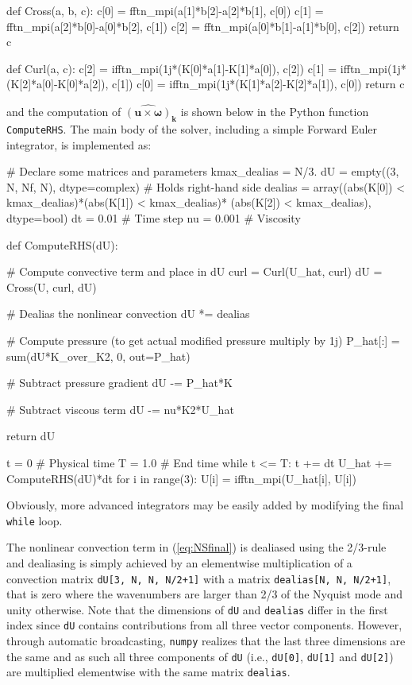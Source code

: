 \documentclass[11pt, oneside]{article}
\newcommand{\inpyth}{\lstinline[style=pythonstyle, basicstyle=\ttfamily]} %[]%
\begin{document}
\begin{python}
def Cross(a, b, c):
    c[0] = fftn_mpi(a[1]*b[2]-a[2]*b[1], c[0])
    c[1] = fftn_mpi(a[2]*b[0]-a[0]*b[2], c[1])
    c[2] = fftn_mpi(a[0]*b[1]-a[1]*b[0], c[2])
    return c

def Curl(a, c):
    c[2] = ifftn_mpi(1j*(K[0]*a[1]-K[1]*a[0]), c[2])
    c[1] = ifftn_mpi(1j*(K[2]*a[0]-K[0]*a[2]), c[1])
    c[0] = ifftn_mpi(1j*(K[1]*a[2]-K[2]*a[1]), c[0])
    return c

\end{python}
and the computation of $\widehat{( \bm{u} \times \bm{\omega})}_{\bm{k}}$ is shown below in the Python function \inpyth{ComputeRHS}. The main body of the solver, including a simple Forward Euler integrator, is implemented as:
\begin{python}
# Declare some matrices and parameters
kmax_dealias = N/3.
dU = empty((3, N, Nf, N), dtype=complex)  # Holds right-hand side
dealias = array((abs(K[0]) < kmax_dealias)*(abs(K[1]) < kmax_dealias)*
                (abs(K[2]) < kmax_dealias), dtype=bool)
dt = 0.01    # Time step
nu = 0.001   # Viscosity

def ComputeRHS(dU):

    # Compute convective term and place in dU
    curl = Curl(U_hat, curl)
    dU = Cross(U, curl, dU)

    # Dealias the nonlinear convection
    dU *= dealias

    # Compute pressure (to get actual modified pressure multiply by 1j)
    P_hat[:] = sum(dU*K_over_K2, 0, out=P_hat)

    # Subtract pressure gradient
    dU -= P_hat*K

    # Subtract viscous term
    dU -= nu*K2*U_hat

    return dU

t = 0        # Physical time
T = 1.0      # End time
while t <= T:
    t += dt
    U_hat += ComputeRHS(dU)*dt
    for i in range(3):
        U[i] = ifftn_mpi(U_hat[i], U[i])

\end{python}
Obviously, more advanced integrators may be easily added by modifying the final \inpyth{while} loop. 

The nonlinear convection term in (\ref{eq:NSfinal}) is dealiased using the 2/3-rule and dealiasing is simply achieved by an elementwise multiplication of a convection matrix \inpyth{dU[3, N, N, N/2+1]} with a matrix \inpyth{dealias[N, N, N/2+1]}, that is zero where the wavenumbers are larger than 2/3 of the Nyquist mode and unity otherwise. Note that the dimensions of \inpyth{dU} and \inpyth{dealias} differ in the first index since \inpyth{dU} contains contributions from all three vector components. However, through automatic broadcasting, \texttt{numpy} realizes that the last three dimensions are the same and as such all three components of \inpyth{dU} (i.e.,  \inpyth{dU[0]}, \inpyth{dU[1]} and  \inpyth{dU[2]}) are multiplied elementwise with the same matrix \inpyth{dealias}. 
\end{document}
